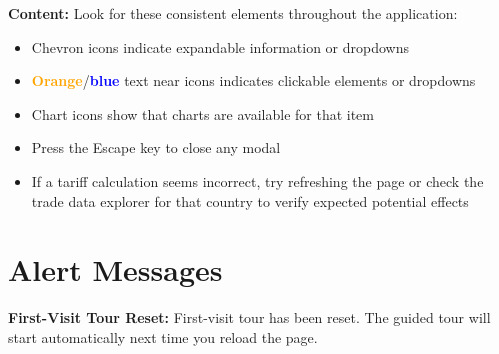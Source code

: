 \documentclass[11pt]{article}
\begin{document}
\textbf{Content:} Look for these consistent elements throughout the application:
\begin{itemize}
    \item Chevron icons indicate expandable information or dropdowns
    \item \textcolor{orange}{\textbf{Orange}}/\textcolor{blue}{\textbf{blue}} text near icons indicates clickable elements or dropdowns
    \item Chart icons show that charts are available for that item
    \item Press the Escape key to close any modal
    \item If a tariff calculation seems incorrect, try refreshing the page or check the trade data explorer for that country to verify expected potential effects
\end{itemize}

\section{Alert Messages}
\textbf{First-Visit Tour Reset:} First-visit tour has been reset. The guided tour will start automatically next time you reload the page.
\end{document}
